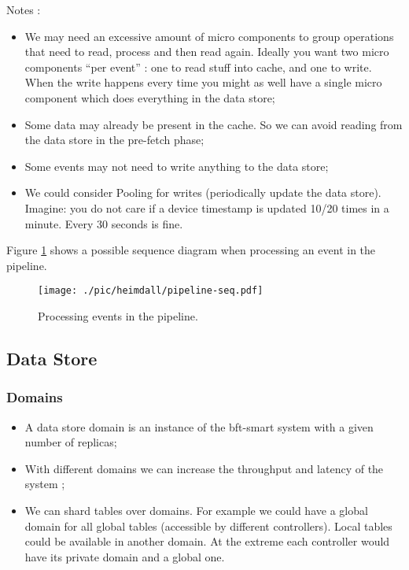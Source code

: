 \documentclass[12pt,openright,twoside]{report}
\begin{document}
Notes : 
\begin{itemize}
\item We may need an excessive amount of micro components to group operations that need to read, process and then read again. Ideally you want two micro components ``per event'' : one to read stuff into cache, and one to write. When the write happens every time you might as well have a single micro component which does everything in the data store; 
\item Some data may already be present in the cache. So we can avoid reading from the data store in the pre-fetch phase;
\item Some events may not need to write anything to the data store;
\item We could consider Pooling for writes (periodically  update the data store). Imagine: you do not care if a device timestamp is updated 10/20 times in a minute. Every 30 seconds is fine.  
\end{itemize}

Figure \ref{fig:pipeline-seq} shows a possible sequence diagram when processing an event in the pipeline. 

\begin{figure}[ht]
  \centering
  \texttt{[image: ./pic/heimdall/pipeline-seq.pdf]}
  \caption{Processing events in the pipeline. }
  \label{fig:pipeline-seq}
\end{figure}


\subsection{Data Store}

\subsubsection{Domains}
\begin{itemize}
\item A data store domain is an instance of the bft-smart system with a given number of replicas;
\item With different domains we can increase the throughput and latency of the system ; 
\item We can shard tables over domains. For example we could have a global domain for all global tables (accessible by different controllers). Local tables could be available in another domain. At the extreme each controller would have its private domain and a global one. 
\end{itemize}
\end{document}
